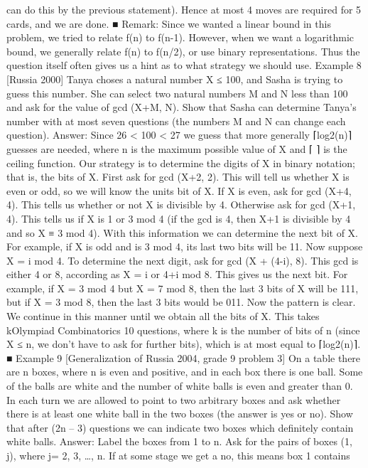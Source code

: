 \documentclass[a4paper,11pt]{book}
\begin{document}
can do this by the previous statement). Hence at most 4 moves are
required for 5 cards, and we are done. ■
Remark: Since we wanted a linear bound in this problem, we
tried to relate f(n) to f(n-1). However, when we want a logarithmic
bound, we generally relate f(n) to f(n/2), or use binary
representations. Thus the question itself often gives us a hint as to
what strategy we should use.
Example 8 [Russia 2000]
Tanya choses a natural number X ≤ 100, and Sasha is trying to
guess this number. She can select two natural numbers M and N
less than 100 and ask for the value of gcd (X+M, N). Show that
Sasha can determine Tanya's number with at most seven
questions (the numbers M and N can change each question).
Answer:
Since 26 < 100 < 27 we guess that more generally ⌈log2(n)⌉
guesses are needed, where n is the maximum possible value of X
and ⌈ ⌉ is the ceiling function.
Our strategy is to determine the digits of X in binary notation;
that is, the bits of X. First ask for gcd (X+2, 2). This will tell us
whether X is even or odd, so we will know the units bit of X. If X is
even, ask for gcd (X+4, 4). This tells us whether or not X is
divisible by 4. Otherwise ask for gcd (X+1, 4). This tells us if X is 1
or 3 mod 4 (if the gcd is 4, then X+1 is divisible by 4 and so X ≡ 3
mod 4). With this information we can determine the next bit of X.
For example, if X is odd and is 3 mod 4, its last two bits will be 11.
Now suppose X = i mod 4. To determine the next digit, ask for gcd
(X + (4-i), 8). This gcd is either 4 or 8, according as X = i or 4+i mod
8. This gives us the next bit. For example, if X = 3 mod 4 but X = 7
mod 8, then the last 3 bits of X will be 111, but if X = 3 mod 8, then
the last 3 bits would be 011. Now the pattern is clear. We continue
in this manner until we obtain all the bits of X. This takes kOlympiad Combinatorics 10
questions, where k is the number of bits of n (since X ≤ n, we don’t
have to ask for further bits), which is at most equal to ⌈log2(n)⌉. ■
Example 9 [Generalization of Russia 2004, grade 9 problem
3]
On a table there are n boxes, where n is even and positive, and in
each box there is one ball. Some of the balls are white and the
number of white balls is even and greater than 0. In each turn we
are allowed to point to two arbitrary boxes and ask whether there
is at least one white ball in the two boxes (the answer is yes or
no). Show that after (2n – 3) questions we can indicate two boxes
which definitely contain white balls.
Answer:
Label the boxes from 1 to n. Ask for the pairs of boxes (1, j), where
j= 2, 3, …, n. If at some stage we get a no, this means box 1 contains
\end{document}
